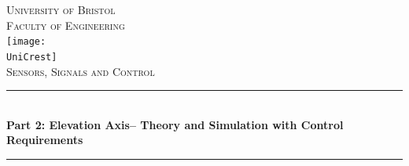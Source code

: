 \documentclass[11pt]{article}
\newcommand{\AssignmentTitle}{Part 2: Elevation Axis– Theory and Simulation with Control Requirements}
\newcommand{\ModuleTitle}{Sensors, Signals and Control}
\newcommand{\University}{University of Bristol}
\newcommand{\Faculty}{Faculty of Engineering}
\newcommand{\UniCrest}{crestbris.png}
\newcommand{\horrule}[1]{\rule{\linewidth}{#1}}
\begin{document}
  \setlength{\abovedisplayskip}{-14pt}
  \setlength{\belowdisplayskip}{2pt}
  \setlength{\abovedisplayshortskip}{-14pt}
  \setlength{\belowdisplayshortskip}{2pt}



\begin{titlepage}

	\center %
		\normalfont \normalsize \textsc{\University} \\ [10pt]
		\normalfont \normalsize \textsc{\Faculty} \\ [25pt]
		\texttt{[image: \\UniCrest]}\\[0.5cm]
		\normalfont \normalsize \textsc{\ModuleTitle} \\ [25pt]
		\horrule{0.5pt} \\[0.4cm]
		\huge \textbf{\AssignmentTitle} \\
		\horrule{2pt} \\[0.5cm]

\end{titlepage}
\end{document}
